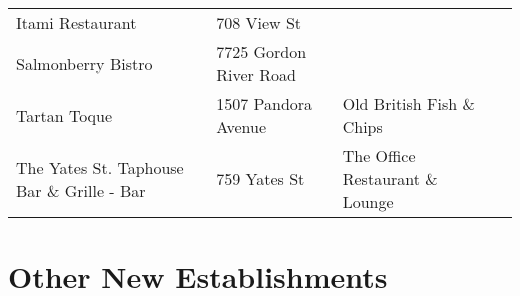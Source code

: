 \documentclass[9pt]{article}
\begin{document}
\begin{tabular}{p{5cm}|p{3.7cm}|p{4.8cm}|p{4cm}}
Itami Restaurant                           & 708 View St                 &                                   &                 \\
Salmonberry Bistro                         & 7725 Gordon River Road      &                                   &                 \\
Tartan Toque                               & 1507 Pandora Avenue         & Old British Fish \& Chips         &                 \\
The Yates St. Taphouse Bar \& Grille - Bar & 759 Yates St                & The Office Restaurant \& Lounge   &                 \\
\end{tabular}



\section{Other New Establishments}
\end{document}
